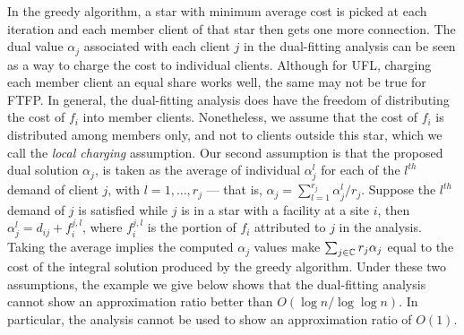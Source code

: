 \documentclass[oneside,final]{ucr}
\begin{document}
In the greedy algorithm, a star with minimum average cost is
picked at each iteration and each member client of that star
then gets one more connection. The dual value $\alpha_j$
associated with each client $j$ in the dual-fitting analysis
can be seen as a way to charge the cost to individual
clients. Although for UFL, charging each member client an
equal share works well, the same may not be true for
FTFP. In general, the dual-fitting analysis does have the
freedom of distributing the cost of $f_i$ into member
clients. Nonetheless, we assume that the cost of $f_i$ is
distributed among members only, and not to clients outside
this star, which we call the \emph{local charging}
assumption. Our second assumption is that the proposed dual
solution $\alpha_j$, is taken as the average of individual
$\alpha_j^l$ for each of the $l^{th}$ demand of client $j$,
with $l=1,\ldots,r_j$ --- that is, $\alpha_j =
\sum_{l=1}^{r_j} \alpha_j^l / r_j$. Suppose the $l^{th}$
demand of $j$ is satisfied while $j$ is in a star with a
facility at a site $i$, then $\alpha_j^l = d_{ij} +
f_i^{j,l}$, where $f_i^{j,l}$ is the portion of $f_i$
attributed to $j$ in the analysis. Taking the average
implies the computed $\alpha_j$ values make
$\sum_{j\in\mathbb{C}} r_j \alpha_j$ equal to the cost of
the integral solution produced by the greedy
algorithm. Under these two assumptions, the example we give
below shows that the dual-fitting analysis cannot show an
approximation ratio better than $O(\log n / \log \log
n)$. In particular, the analysis cannot be used to show an
approximation ratio of $O(1)$.
\end{document}
